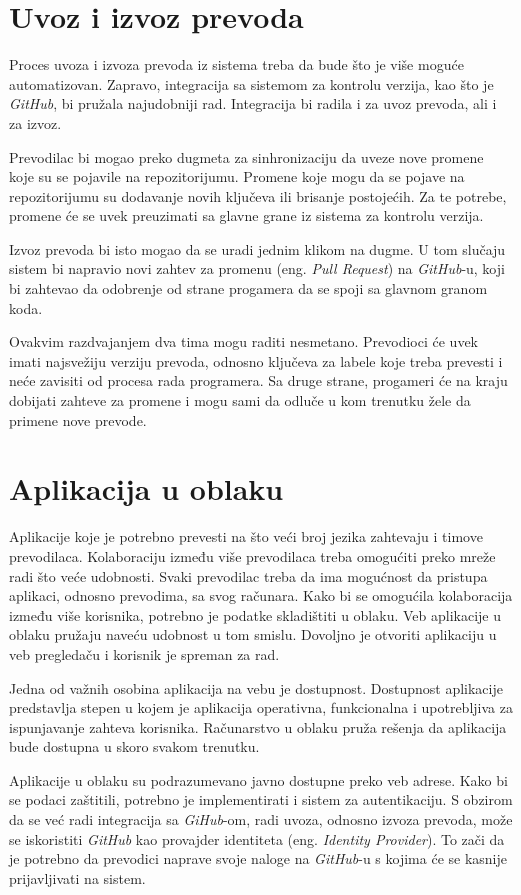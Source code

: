 \section{Uvoz i izvoz prevoda}\label{sec:funkcionalni_zahtevi-uvoz_izvoz}

Proces uvoza i izvoza prevoda iz sistema treba da bude što je više moguće automatizovan. Zapravo, integracija
sa sistemom za kontrolu verzija, kao što je \textit{GitHub}, bi pružala najudobniji rad. Integracija bi radila i za 
uvoz prevoda, ali i za izvoz. 

Prevodilac bi mogao preko dugmeta za sinhronizaciju da uveze nove promene 
koje su se pojavile na repozitorijumu. Promene koje mogu da se pojave na repozitorijumu su dodavanje novih 
ključeva ili brisanje postojećih. Za te potrebe, promene će se uvek preuzimati sa glavne grane iz sistema za 
kontrolu verzija. 

Izvoz prevoda bi isto mogao da se uradi jednim klikom na dugme. U tom slučaju sistem bi napravio novi zahtev 
za promenu (eng. \textit{Pull Request}) na \textit{GitHub}-u, koji bi zahtevao da odobrenje od strane progamera da se spoji sa 
glavnom granom koda.

Ovakvim razdvajanjem dva tima mogu raditi nesmetano. Prevodioci će uvek imati najsvežiju verziju prevoda, 
odnosno ključeva za labele koje treba prevesti i neće zavisiti od procesa rada programera. Sa druge strane,
progameri će na kraju dobijati zahteve za promene i mogu sami da odluče u kom trenutku žele da primene nove
prevode.


\section{Aplikacija u oblaku}\label{sec:funkcionalni_zahtevi-aplikacija_u_oblaku}

Aplikacije koje je potrebno prevesti na što veći broj jezika zahtevaju i timove prevodilaca. Kolaboraciju 
između više prevodilaca treba omogućiti preko mreže radi što veće udobnosti. Svaki prevodilac treba da ima 
mogućnost da pristupa aplikaci, odnosno prevodima, sa svog računara. Kako bi se omogućila kolaboracija 
između više korisnika, potrebno je podatke skladištiti u oblaku. Veb aplikacije u oblaku pružaju naveću 
udobnost u tom smislu. Dovoljno je otvoriti aplikaciju u veb pregledaču i korisnik je spreman za rad.

Jedna od važnih osobina aplikacija na vebu je dostupnost. Dostupnost aplikacije predstavlja stepen u kojem je 
aplikacija operativna, funkcionalna i upotrebljiva za ispunjavanje zahteva korisnika. 
Računarstvo u oblaku pruža rešenja da aplikacija bude dostupna u skoro svakom trenutku.

Aplikacije u oblaku su podrazumevano javno dostupne preko veb adrese. Kako bi se podaci zaštitili,
potrebno je implementirati i sistem za autentikaciju. S obzirom da se već radi integracija sa \textit{GiHub}-om, radi
uvoza, odnosno izvoza prevoda, može se iskoristiti \textit{GitHub} kao provajder identiteta (eng. \textit{Identity Provider}).
To zači da je potrebno da prevodici naprave svoje naloge na \textit{GitHub}-u s kojima će se kasnije prijavljivati 
na sistem.